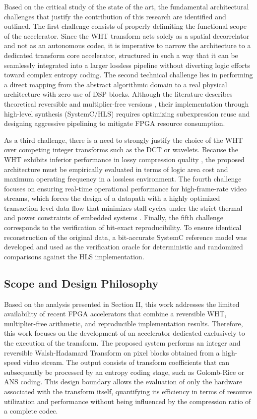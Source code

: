\documentclass[conference]{IEEEtran}
\begin{document}
Based on the critical study of the state of the art, the fundamental architectural challenges that justify the contribution of this research are identified and outlined. The first challenge consists of properly delimiting the functional scope of the accelerator. Since the WHT transform acts solely as a spatial decorrelator and not as an autonomous codec, it is imperative to narrow the architecture to a dedicated transform core accelerator, structured in such a way that it can be seamlessly integrated into a larger lossless pipeline without diverting logic efforts toward complex entropy coding. The second technical challenge lies in performing a direct mapping from the abstract algorithmic domain to a real physical architecture with zero use of DSP blocks. Although the literature describes theoretical reversible and multiplier-free versions \cite{komatsu2001}, their implementation through high-level synthesis (SystemC/HLS) requires optimizing subexpression reuse and designing aggressive pipelining to mitigate FPGA resource consumption.

As a third challenge, there is a need to strongly justify the choice of the WHT over competing integer transforms such as the DCT or wavelets. Because the WHT exhibits inferior performance in lossy compression quality \cite{regorsek2024}, the proposed architecture must be empirically evaluated in terms of logic area cost and maximum operating frequency in a lossless environment. The fourth challenge focuses on ensuring real-time operational performance for high-frame-rate video streams, which forces the design of a datapath with a highly optimized transaction-level data flow that minimizes stall cycles under the strict thermal and power constraints of embedded systems \cite{amira2007}. Finally, the fifth challenge corresponds to the verification of bit-exact
reproducibility. To ensure identical reconstruction of the original data, a
bit-accurate SystemC reference model was developed and used as the verification
oracle for deterministic and randomized comparisons against the HLS implementation.


\subsection{Scope and Design Philosophy}
Based on the analysis presented in Section II, this work addresses the limited availability of recent FPGA accelerators that combine a reversible WHT, multiplier-free arithmetic, and reproducible implementation results. Therefore, this work focuses on the development of an accelerator dedicated exclusively to the execution of the transform.
The proposed system performs an integer and reversible Walsh-Hadamard Transform on pixel blocks obtained from a high-speed video stream. The output consists of transform coefficients that can subsequently be processed by an entropy coding stage, such as Golomb-Rice or ANS coding.
This design boundary allows the evaluation of only the hardware associated with the transform itself, quantifying its efficiency in terms of resource utilization and performance without being influenced by the compression ratio of a complete codec.
\end{document}
